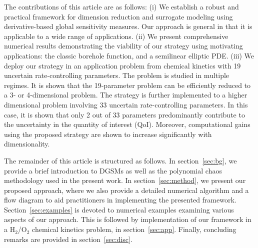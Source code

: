 
The contributions of this article are as follows: (i) We establish a robust and
practical framework for dimension reduction and surrogate modeling using
derivative-based global sensitivity measures. Our
approach is general in that it is applicable to a wide range of applications.
(ii) We present comprehensive numerical results demonstrating the viability of
our strategy using motivating applications: the classic borehole
function, and a semilinear elliptic PDE.  (iii) We 
deploy our strategy in an application problem from chemical kinetics with 19
uncertain rate-controlling parameters. The problem is studied in multiple regimes.
It is shown that the 19-parameter problem can be efficiently reduced to a 3- 
or 4-dimensional problem. The strategy is further implemented to a
higher dimensional problem involving 33 uncertain rate-controlling parameters.
In this case, it is shown that only 2 out of 33 parameters predominantly 
contribute to the uncertainty in the quantity of interest (QoI). Moreover, 
computational gains using the proposed strategy are shown to increase significantly
with dimensionality.

The remainder of this article is structured as follows. 
In section~\ref{sec:bg}, we provide a
brief introduction to DGSMs as well as the polynomial chaos methodology used in
the present work.  In section~\ref{sec:method}, we present our proposed
approach, where we also provide a detailed numerical algorithm and a flow
diagram to aid practitioners in implementing the presented framework.
Section~\ref{sec:examples} is devoted to numerical examples
examining various aspects of our approach. This is followed by implementation
of our framework in a H$_2$/O$_2$ chemical kinetics problem, in section~\ref{sec:app}.
Finally, concluding remarks are provided in section~\ref{sec:disc}.






